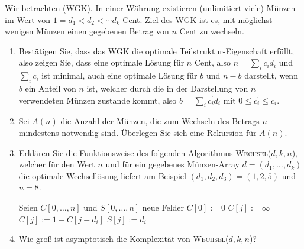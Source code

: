 
\begin{exercise}

Wir betrachten  (WGK).
In einer Währung existieren (unlimitiert viele) Münzen im Wert von $1 = d_1 < d_2 < \cdots  d_k$ Cent.
Ziel des WGK ist es, mit möglichst wenigen Münzen einen gegebenen Betrag von $n$ Cent zu wechseln.

\begin{enumerate}[label = \alph*)]

  \item Bestätigen Sie, dass das WGK die optimale Teilstruktur-Eigenschaft erfüllt, also zeigen Sie, dass eine optimale Lösung für $n$ Cent, also $n = \sum_{i} c_i d_i$ und $\sum_i c_i$ ist minimal, auch eine optimale Lösung für $b$ und $n - b$ darstellt, wenn $b$ ein Anteil von $n$ ist, welcher durch die in der Darstellung von $n$ verwendeten Münzen zustande kommt, also $b = \sum_i c_i^\prime d_i$ mit $0 \leq c_i^\prime \leq c_i$.

  \item Sei $A(n)$ die Anzahl der Münzen, die zum Wechseln des Betrags $n$ mindestens notwendig sind.
  Überlegen Sie sich eine Rekursion für $A(n)$.

  \item Erklären Sie die Funktionsweise des folgenden Algorithmus \textsc{Wechsel}($d, k, n$), welcher für den Wert $n$ und für ein gegebenes Münzen-Array $d = (d_1, \dots, d_k)$ die optimale Wechsellösung liefert am Beispiel $(d_1, d_2, d_3) = (1, 2, 5)$ und $n = 8$.

  \begin{algorithm}
      \begin{algorithmic}[1]
          \State Seien $C[0, \dots, n]$ und $S[0, \dots, n]$ neue Felder
          \State $C[0] := 0$
              \State $C[j] := \infty$
                      \State $C[j] := 1 + C[j - d_i]$
                      \State $S[j] := d_i$
                  \EndIf
              \EndFor
          \EndFor
          \EndProcedure
      \end{algorithmic}
  \end{algorithm}

  \item Wie groß ist asymptotisch die Komplexität von \textsc{Wechsel}($d, k, n$)?

\end{enumerate}


\end{exercise}

